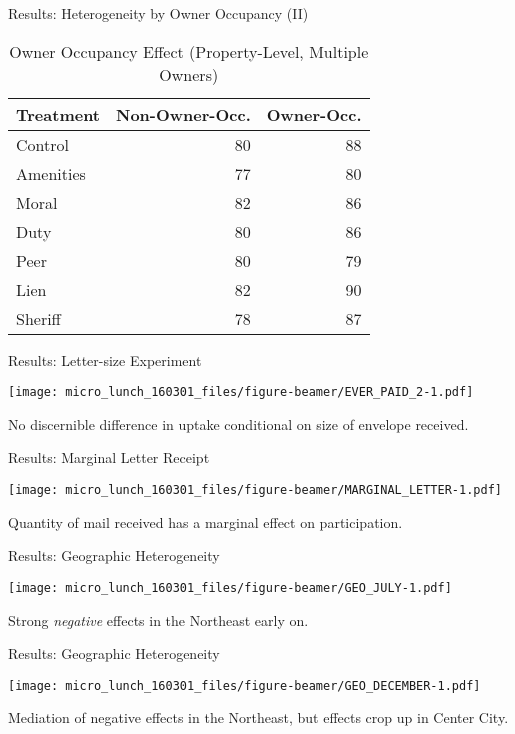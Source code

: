 \documentclass[ignorenonframetext,]{beamer}
\begin{document}
\begin{frame}{Results: Heterogeneity by Owner Occupancy (II)}

\begin{table}[ht]
\centering
\begin{tabular}{lrr}
  \hline
Treatment & Non-Owner-Occ. & Owner-Occ. \\ 
  \hline
Control & 80 & 88 \\ 
  Amenities & 77 & 80 \\ 
  Moral & 82 & 86 \\ 
  Duty & 80 & 86 \\ 
  Peer & 80 & 79 \\ 
  Lien & 82 & 90 \\ 
  Sheriff & 78 & 87 \\ 
   \hline
\end{tabular}
\caption{Owner Occupancy Effect (Property-Level, Multiple Owners)} 
\label{table:delta_by_owner_occ_mlt}
\end{table}

\end{frame}

\begin{frame}{Results: Letter-size Experiment}

\texttt{[image: micro\_lunch\_160301\_files/figure-beamer/EVER\_PAID\_2-1.pdf]}

No discernible difference in uptake conditional on size of envelope
received.

\end{frame}

\begin{frame}{Results: Marginal Letter Receipt}

\texttt{[image: micro\_lunch\_160301\_files/figure-beamer/MARGINAL\_LETTER-1.pdf]}

Quantity of mail received has a marginal effect on participation.

\end{frame}

\begin{frame}{Results: Geographic Heterogeneity}

\texttt{[image: micro\_lunch\_160301\_files/figure-beamer/GEO\_JULY-1.pdf]}

Strong \emph{negative} effects in the Northeast early on.

\end{frame}

\begin{frame}{Results: Geographic Heterogeneity}

\texttt{[image: micro\_lunch\_160301\_files/figure-beamer/GEO\_DECEMBER-1.pdf]}

Mediation of negative effects in the Northeast, but effects crop up in
Center City.

\end{frame}
\end{document}
